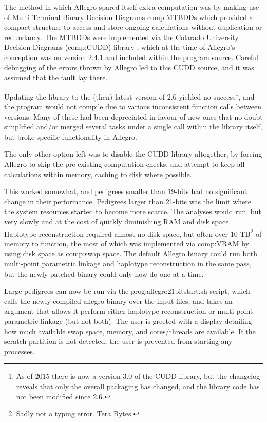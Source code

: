The method in which Allegro spared itself extra computation was by making use of Multi Terminal Binary Decision Diagrams \gls{comp:MTBDD}s   which provided a compact structure to access and store ongoing calculations without duplication or redundancy\citep{mtbdd}. The MTBDDs were implemented via the Colarado University Decision Diagrams (\gls{comp:CUDD}) library \citep{cudd}, which at the time of Allegro's conception was on version 2.4.1 and included within the program source.  Careful debugging of the errors thrown by Allegro led to this CUDD source, and it was assumed that the fault lay there.

Updating the library to the (then) latest version of 2.6 yielded no success\footnote{As of 2015 there is now a version 3.0 of the CUDD library, but the changelog  reveals that only the overall packaging has changed, and the library code has not been modified since 2.6.}, and the program would not compile due to various inconsistent function calls between versions. Many of these had been depreciated in favour of new ones that no doubt simplified and/or merged several tasks under a single call within the library itself, but broke specific functionality in Allegro.

The only other option left was to disable the CUDD library altogether, by forcing Allegro to skip the pre-existing computation checks, and attempt to keep all calculations within memory, caching to disk where possible.

This worked somewhat, and pedigrees smaller than 19-bits had no significant change in their performance. Pedigrees larger than 21-bits was the limit where the system resources started to become more scarce. The analyses would run, but very slowly and at the cost of quickly diminishing RAM and disk space. Haplotype reconstruction required almost no disk space, but often over 10 TB\footnote{Sadly not a typing error. Tera Bytes.} of memory to function, the most of which was implemented via \gls{comp:VRAM} by using disk space as \gls{comp:swap space}. The default Allegro binary could run both multi-point parametric linkage and haplotype reconstruction in the same pass, but the newly patched binary could only now do one at a time.

Large pedigrees can now be run via the \gls{prog:allegro21bitstart.sh} script, which calls  the newly compiled allegro binary over the input files, and takes an argument that allows it perform either haplotype reconstruction or multi-point parametric linkage (but not both). The user is greeted with a display detailing how much available swap space, memory, and cores/threads are available. If the scratch partition is not detected, the user is prevented from starting any processes. 


